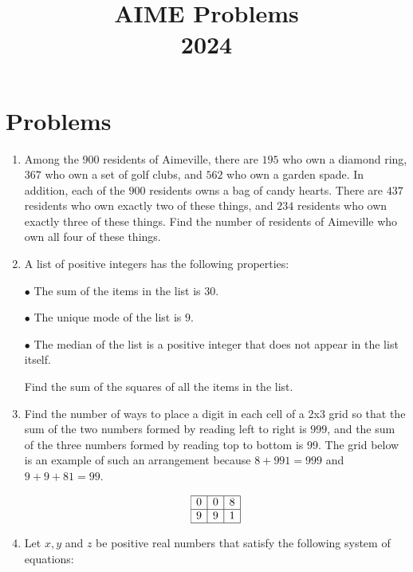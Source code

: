 \documentclass{article}
\title{AIME Problems \\ 2024}
\date{}
\begin{document}
\maketitle\thispagestyle{fancy}\newpage\section*{Problems}\begin{enumerate}[label=\arabic*., itemsep=0.5em]\item Among the $900$ residents of Aimeville, there are $195$ who own a diamond ring, $367$ who own a set of golf clubs, and $562$ who own a garden spade. In addition, each of the $900$ residents owns a bag of candy hearts. There are $437$ residents who own exactly two of these things, and $234$ residents who own exactly three of these things. Find the number of residents of Aimeville who own all four of these things.\par \vspace{0.5em}\item A list of positive integers has the following properties:

$\bullet$ The sum of the items in the list is $30$.

$\bullet$ The unique mode of the list is $9$.

$\bullet$ The median of the list is a positive integer that does not appear in the list itself.

Find the sum of the squares of all the items in the list.\par \vspace{0.5em}\item Find the number of ways to place a digit in each cell of a 2x3 grid so that the sum of the two numbers formed by reading left to right is $999$, and the sum of the three numbers formed by reading top to bottom is $99$. The grid below is an example of such an arrangement because $8+991=999$ and $9+9+81=99$.


\begin{equation*}
\begin{array}{|c|c|c|} \hline
0 & 0 & 8 \\ \hline
9 & 9 & 1 \\ \hline
\end{array}
\end{equation*}
\par \vspace{0.5em}\item Let $x,y$ and $z$ be positive real numbers that satisfy the following system of equations:


\end{enumerate}
\end{document}
